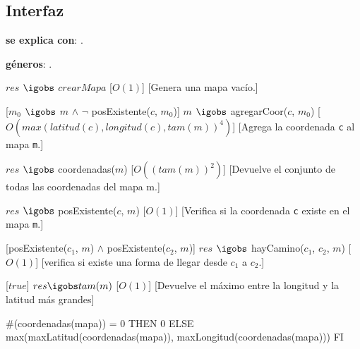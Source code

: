 \begin{Interfaz}
\subsection{Interfaz}

\textbf{se explica con}: .

\textbf{g\'eneros}: .



%
{$res$ $\igobs$ $crearMapa$}%
[$O(1)$]
[Genera una mapa vac\'io.]


[$m_0$ $\igobs$ $m$ $\land$ $\lnot$ posExistente($c$, $m_0$)]  
{$m$ $\igobs$ agregarCoor($c$, $m_0$)}
[$O(  max(latitud(c), longitud(c), tam(m))^4  )$]
[Agrega la coordenada \texttt{c} al mapa \texttt{m}.]


%
{$res$ $\igobs$ coordenadas($m$)}%
[$O((tam(m))^2)$]  %
[Devuelve el conjunto de todas las coordenadas del mapa m.]


{$res$ $\igobs$ posExistente($c$, $m$)}
[$O(1)$]
[Verifica si la coordenada \texttt{c} existe en el mapa \texttt{m}.]


[posExistente($c_1$, $m$) $\land$ posExistente($c_2$, $m$)]
{$res$ $\igobs$ hayCamino($c_1$, $c_2$, $m$)}
[$O(1)$]
[verifica si existe una forma de llegar desde \texttt{$c_1$} a \texttt{$c_2$}.]

[$true$]
{$res \igobs tam(m)$}
[$O(1)$]
[Devuelve el m\'aximo entre la longitud y la latitud m\'as grandes]

  
\begin{tad}{}



{
\IF
$\#$(coordenadas(mapa)) = 0
THEN
0
ELSE
max(maxLatitud(coordenadas(mapa)), maxLongitud(coordenadas(mapa)))
FI
}


\end{tad}
\end{Interfaz}
